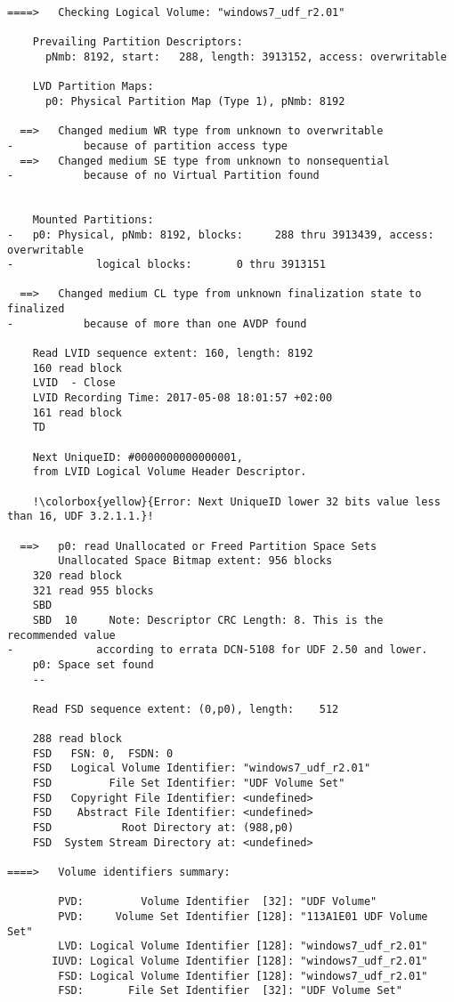 \begin{lstlisting}
====>   Checking Logical Volume: "windows7_udf_r2.01"

    Prevailing Partition Descriptors:
      pNmb: 8192, start:   288, length: 3913152, access: overwritable

    LVD Partition Maps:
      p0: Physical Partition Map (Type 1), pNmb: 8192

  ==>   Changed medium WR type from unknown to overwritable
-           because of partition access type
  ==>   Changed medium SE type from unknown to nonsequential
-           because of no Virtual Partition found


    Mounted Partitions:
-   p0: Physical, pNmb: 8192, blocks:     288 thru 3913439, access: overwritable
-             logical blocks:       0 thru 3913151

  ==>   Changed medium CL type from unknown finalization state to finalized
-           because of more than one AVDP found

    Read LVID sequence extent: 160, length: 8192
    160 read block
    LVID  - Close
    LVID Recording Time: 2017-05-08 18:01:57 +02:00
    161 read block
    TD  

    Next UniqueID: #0000000000000001,
    from LVID Logical Volume Header Descriptor.

    !\colorbox{yellow}{Error: Next UniqueID lower 32 bits value less than 16, UDF 3.2.1.1.}!

  ==>   p0: read Unallocated or Freed Partition Space Sets
        Unallocated Space Bitmap extent: 956 blocks
    320 read block
    321 read 955 blocks
    SBD 
    SBD  10     Note: Descriptor CRC Length: 8. This is the recommended value
-             according to errata DCN-5108 for UDF 2.50 and lower.
    p0: Space set found
    --

    Read FSD sequence extent: (0,p0), length:    512

    288 read block
    FSD   FSN: 0,  FSDN: 0
    FSD   Logical Volume Identifier: "windows7_udf_r2.01"
    FSD         File Set Identifier: "UDF Volume Set"
    FSD   Copyright File Identifier: <undefined>
    FSD    Abstract File Identifier: <undefined>
    FSD           Root Directory at: (988,p0)
    FSD  System Stream Directory at: <undefined>

====>   Volume identifiers summary:

        PVD:         Volume Identifier  [32]: "UDF Volume"
        PVD:     Volume Set Identifier [128]: "113A1E01 UDF Volume Set"
        LVD: Logical Volume Identifier [128]: "windows7_udf_r2.01"
       IUVD: Logical Volume Identifier [128]: "windows7_udf_r2.01"
        FSD: Logical Volume Identifier [128]: "windows7_udf_r2.01"
        FSD:       File Set Identifier  [32]: "UDF Volume Set"


\end{lstlisting}
